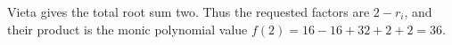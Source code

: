 Vieta gives the total root sum two. Thus the requested factors are $2-r_i$, and their product is the monic polynomial value $f(2)=16-16+32+2+2=\boxed{36}$.
